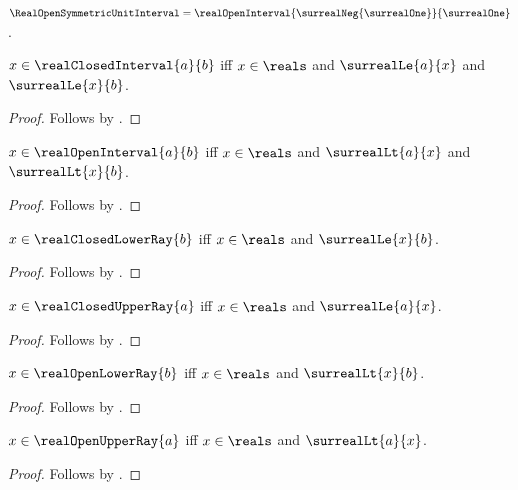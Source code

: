 \begin{definition}\label{real_open_symmetric_unit_interval}
    $\RealOpenSymmetricUnitInterval=
        \realOpenInterval{\surrealNeg{\surrealOne}}{\surrealOne}$.
\end{definition}

\begin{proposition}\label{real_closed_interval_member_iff}
    $x\in\realClosedInterval{a}{b}$ iff $x\in\reals$ and
        $\surrealLe{a}{x}$ and $\surrealLe{x}{b}$.
\end{proposition}
\begin{proof}
    Follows by .
\end{proof}

\begin{proposition}\label{real_open_interval_member_iff}
    $x\in\realOpenInterval{a}{b}$ iff $x\in\reals$ and
        $\surrealLt{a}{x}$ and $\surrealLt{x}{b}$.
\end{proposition}
\begin{proof}
    Follows by .
\end{proof}

\begin{proposition}\label{real_closed_lower_ray_member_iff}
    $x\in\realClosedLowerRay{b}$ iff
        $x\in\reals$ and $\surrealLe{x}{b}$.
\end{proposition}
\begin{proof}
    Follows by .
\end{proof}

\begin{proposition}\label{real_closed_upper_ray_member_iff}
    $x\in\realClosedUpperRay{a}$ iff
        $x\in\reals$ and $\surrealLe{a}{x}$.
\end{proposition}
\begin{proof}
    Follows by .
\end{proof}

\begin{proposition}\label{real_open_lower_ray_member_iff}
    $x\in\realOpenLowerRay{b}$ iff
        $x\in\reals$ and $\surrealLt{x}{b}$.
\end{proposition}
\begin{proof}
    Follows by .
\end{proof}

\begin{proposition}\label{real_open_upper_ray_member_iff}
    $x\in\realOpenUpperRay{a}$ iff
        $x\in\reals$ and $\surrealLt{a}{x}$.
\end{proposition}
\begin{proof}
    Follows by .
\end{proof}

